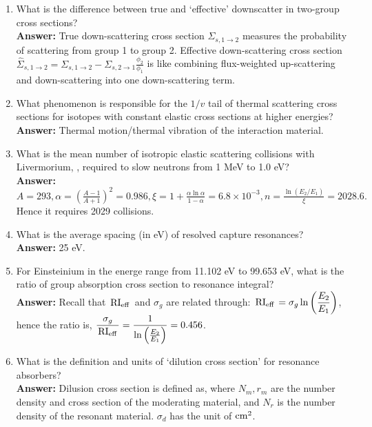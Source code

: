\documentclass{school-22.211-notes}
\begin{document}
\begin{enumerate}
\begin{enumerate}
  \item What is the difference between true and `effective' downscatter in two-group cross sections? \\
    \textbf{Answer:} True down-scattering cross section $\Sigma_{s,1\to 2}$ measures the probability of scattering from group 1 to group 2. Effective down-scattering cross section $\displaystyle \hat{\Sigma}_{s,1\to 2} = \Sigma_{s,1\to 2} - \Sigma_{s, 2 \to 1} \frac{\phi_2}{\phi_1}$ is like combining flux-weighted up-scattering and down-scattering into one down-scattering term. 

  \item What phenomenon is responsible for the $1/v$ tail of thermal scattering cross sections for isotopes with constant elastic cross sections at higher energies?\\
    \textbf{Answer:} Thermal motion/thermal vibration of the interaction material. 

  \item What is the mean number of isotropic elastic scattering collisions with Livermorium, , required to slow neutrons from 1 MeV to 1.0 eV? \\
    \textbf{Answer:} $\displaystyle A = 293, \alpha = \left( \frac{A-1}{A+1} \right)^2 = 0.986, \xi = 1 + \frac{\alpha \ln \alpha}{1 - \alpha} = 6.8 \times 10^{-3}, n = \frac{\ln (E_2 / E_1)}{\xi} = 2028.6.$ Hence it requires 2029 collisions. 

  \item What is the average spacing (in eV) of  resolved capture resonances? \\
    \textbf{Answer:} 25 eV. 

  \item For Einsteinium  in the energe range from 11.102 eV to 99.653 eV, what is the ratio of group absorption cross section to resonance integral? \\
    \textbf{Answer:} Recall that $\left. \mathrm{RI}_{\mathrm{eff}} \right.$ and $\sigma_g$ are related through: $\displaystyle \left. \mathrm{RI}_{\mathrm{eff}} \right. = \sigma_g \ln \left(\frac{E_2}{E_1} \right)$, hence the ratio is, $\displaystyle \frac{\sigma_g}{\left. \mathrm{RI}_{\mathrm{eff}} \right.} = \frac{1}{\ln  \left(\frac{E_2}{E_1} \right) } = 0.456$. 

  \item What is the definition and units of `dilution cross section' for resonance absorbers? \\
    \textbf{Answer:} Dilusion cross section is defined as, 
    where $N_m, r_m$ are the number density and cross section of the moderating material, and $N_r$ is the number density of the resonant material. $\sigma_d$ has the unit of $\mathrm{cm}^2$. 


\end{enumerate}
\end{enumerate}
\end{document}
